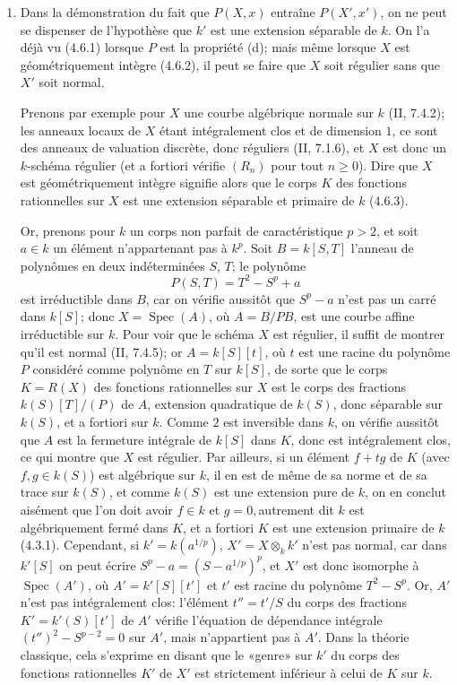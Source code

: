 \begin{remarks}[6.7.5]
\label{IV.2.s6.7.5-fr}
\begin{enumerate}
\item[(i)] Dans la démonstration du fait que $P(X,x)$ entraîne
$P(X',x')$, on ne peut se dispenser de l'hypothèse que $k'$ est une
extension séparable de $k$. On l'a déjà vu (4.6.1) lorsque $P$ est la
propriété (d); mais même lorsque $X$ est géométriquement intègre (4.6.2),
il peut se faire que $X$ soit régulier sans que $X'$ soit normal.

Prenons par exemple pour $X$ une courbe algébrique normale sur $k$
(II, 7.4.2); les anneaux locaux de $X$ étant intégralement clos et de
dimension $1$, ce sont des anneaux de valuation discrète, donc réguliers
(II, 7.1.6), et $X$ est donc un $k$-schéma régulier (et a fortiori
vérifie $(R_n)$ pour tout $n\geqslant0$). Dire que $X$ est géométriquement
intègre signifie alors que le corps $K$ des fonctions rationnelles sur
$X$ est une extension séparable et primaire de $k$ (4.6.3).

Or, prenons pour $k$ un corps non parfait de caractéristique $p>2$, et
soit $a\in k$ un élément n'appartenant pas à $k^p$. Soit
$B=k[S,T]$ l'anneau de polynômes en deux indéterminées $S$, $T$; le
polynôme
\[
P(S,T)=T^2-S^p+a
\]
est irréductible dans $B$, car on vérifie aussitôt que $S^p-a$ n'est pas
un carré dans $k[S]$; donc $X=\operatorname{Spec}(A)$, où $A=B/PB$,
est une courbe affine irréductible sur $k$. Pour voir que le schéma $X$
est régulier, il suffit de montrer qu'il est normal (II, 7.4.5); or
$A=k[S][t]$, où $t$ est une racine du polynôme $P$ considéré comme
polynôme en $T$ sur $k[S]$, de sorte que le corps $K=R(X)$ des fonctions
rationnelles sur $X$ est le corps des fractions $k(S)[T]/(P)$ de $A$,
extension quadratique de $k(S)$, donc séparable sur $k(S)$, et a fortiori
sur $k$. Comme $2$ est inversible dans $k$, on vérifie aussitôt que $A$
est la fermeture intégrale de $k[S]$ dans $K$, donc est intégralement clos,
ce qui montre que $X$ est régulier. Par ailleurs, si un élément $f+tg$
de $K$ (avec $f,g\in k(S)$) est algébrique sur $k$, il en est de même de
sa norme et de sa trace sur $k(S)$, et comme $k(S)$ est une extension pure
de $k$, on en conclut aisément que l'on doit avoir $f\in k$ et $g=0,
$autrement dit $k$ est algébriquement fermé dans $K$, et a fortiori $K$
est une extension primaire de $k$ (4.3.1). Cependant, si
$k'=k(a^{1/p})$, $X'=X\otimes_k k'$ n'est pas normal, car dans $k'[S]$
on peut écrire $S^p-a=(S-a^{1/p})^p$, et $X'$ est donc isomorphe à
$\operatorname{Spec}(A')$, où $A'=k'[S][t']$ et $t'$ est racine du
polynôme $T^2-S^p$. Or, $A'$ n'est pas intégralement clos: l'élément
$t''=t'/S$ du corps des fractions $K'=k'(S)[t']$ de $A'$ vérifie
l'équation de dépendance intégrale $(t'')^2-S^{p-2}=0$ sur $A'$, mais
n'appartient pas à $A'$. Dans la théorie classique, cela s'exprime en
disant que le «genre» sur $k'$ du corps des fonctions rationnelles $K'$ de
$X'$ est strictement inférieur à celui de $K$ sur $k$.


\end{enumerate}
\end{remarks}
